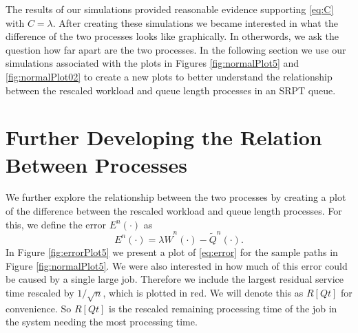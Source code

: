 \documentclass[12pt]{article}
\theoremstyle{plain}
\theoremstyle{definition}
\theoremstyle{remark}
\newcommand{\Wfhat}{\widehat{W}^{n}(\cdot)}
\newcommand{\Qftild}{\widetilde{Q}^{n}(\cdot)}
\begin{document}
The results of our simulations provided reasonable evidence supporting \eqref{eq:C} with $C=\lambda$. After creating these simulations we became interested in what the difference of the two processes looks like graphically. In otherwords, we ask the question how far apart are the two processes. In the following section we use our simulations associated with the plots in Figures \ref{fig:normalPlot5} and \ref{fig:normalPlot02} to create a new plots to better understand the relationship between the rescaled workload and queue length processes in an SRPT queue.

\section{Further Developing the Relation Between Processes} \label{sec:error}
We further explore the relationship between the two processes by creating a plot of the difference between the rescaled workload and queue length processes. For this, we define the error $E^{n}(\cdot)$ as
\begin{equation} \label{eq:error}
E^{n}(\cdot) = \lambda \Wfhat - \Qftild.
\end{equation}
In Figure \ref{fig:errorPlot5} we present a plot of \eqref{eq:error} for the sample paths in Figure \ref{fig:normalPlot5}. We were also interested in how much of this error could be caused by a single large job. Therefore we include the largest residual service time rescaled by $1/\sqrt{n}$, which is plotted in red. We will denote this as $R[Qt]$ for convenience. So $R[Qt]$ is the rescaled remaining processing time of the job in the system needing the most processing time.
\end{document}
